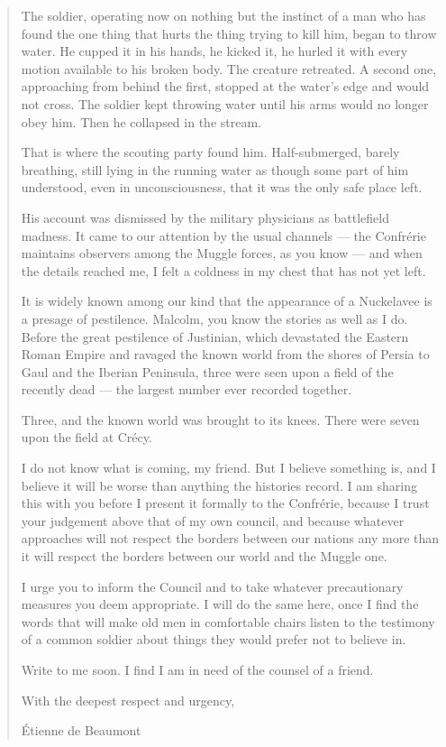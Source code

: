 \begin{quote}
The soldier, operating now on nothing but the instinct of a man who has found the one thing that hurts the thing trying to kill him, began to throw water. He cupped it in his hands, he kicked it, he hurled it with every motion available to his broken body. The creature retreated. A second one, approaching from behind the first, stopped at the water's edge and would not cross. The soldier kept throwing water until his arms would no longer obey him. Then he collapsed in the stream.

That is where the scouting party found him. Half-submerged, barely breathing, still lying in the running water as though some part of him understood, even in unconsciousness, that it was the only safe place left.

His account was dismissed by the military physicians as battlefield madness. It came to our attention by the usual channels --- the Confrérie maintains observers among the Muggle forces, as you know --- and when the details reached me, I felt a coldness in my chest that has not yet left.

It is widely known among our kind that the appearance of a Nuckelavee is a presage of pestilence. Malcolm, you know the stories as well as I do. Before the great pestilence of Justinian, which devastated the Eastern Roman Empire and ravaged the known world from the shores of Persia to Gaul and the Iberian Peninsula, three were seen upon a field of the recently dead — the largest number ever recorded together.

Three, and the known world was brought to its knees. There were seven upon the field at Crécy.

I do not know what is coming, my friend. But I believe something is, and I believe it will be worse than anything the histories record. I am sharing this with you before I present it formally to the Confrérie, because I trust your judgement above that of my own council, and because whatever approaches will not respect the borders between our nations any more than it will respect the borders between our world and the Muggle one.

I urge you to inform the Council and to take whatever precautionary measures you deem appropriate. I will do the same here, once I find the words that will make old men in comfortable chairs listen to the testimony of a common soldier about things they would prefer not to believe in.

Write to me soon. I find I am in need of the counsel of a friend.

\bigskip


With the deepest respect and urgency,


\begin{center}
Étienne de Beaumont
\end{center}

\end{quote}
